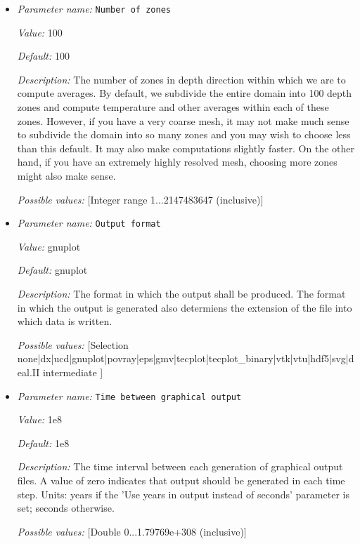 \begin{itemize}
\item {\it Parameter name:} {\tt Number of zones}


{\it Value:} 100


{\it Default:} 100


{\it Description:} The number of zones in depth direction within which we are to compute averages. By default, we subdivide the entire domain into 100 depth zones and compute temperature and other averages within each of these zones. However, if you have a very coarse mesh, it may not make much sense to subdivide the domain into so many zones and you may wish to choose less than this default. It may also make computations slightly faster. On the other hand, if you have an extremely highly resolved mesh, choosing more zones might also make sense.


{\it Possible values:} [Integer range 1...2147483647 (inclusive)]
\item {\it Parameter name:} {\tt Output format}


{\it Value:} gnuplot


{\it Default:} gnuplot


{\it Description:} The format in which the output shall be produced. The format in which the output is generated also determiens the extension of the file into which data is written.


{\it Possible values:} [Selection none|dx|ucd|gnuplot|povray|eps|gmv|tecplot|tecplot_binary|vtk|vtu|hdf5|svg|deal.II intermediate ]
\item {\it Parameter name:} {\tt Time between graphical output}


{\it Value:} 1e8


{\it Default:} 1e8


{\it Description:} The time interval between each generation of graphical output files. A value of zero indicates that output should be generated in each time step. Units: years if the 'Use years in output instead of seconds' parameter is set; seconds otherwise.


{\it Possible values:} [Double 0...1.79769e+308 (inclusive)]
\end{itemize}

